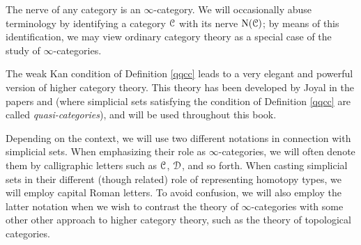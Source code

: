 \begin{1.1.2 inf-Categories}
\begin{example}
The nerve of any category is an $\infty$-category. We will occasionally abuse terminology by
identifying a category $\operatorname{\mathcal{C}}$ with its nerve $\operatorname{N}(\operatorname{\mathcal{C}})$; by means of this identification, we may view ordinary category theory as a special case of the study of $\infty$-categories.
\end{example}

The weak Kan condition of Definition \ref{qqcc} leads to a very elegant and powerful version of higher category theory. This theory has been developed by Joyal in the papers \cite{joyalpub} and
\cite{joyalnotpub} (where simplicial sets satisfying the condition of Definition \ref{qqcc} are called
{\it quasi-categories}), and will be used throughout this book.

\begin{notation}
Depending on the context, we will use two different notations in
connection with simplicial sets. When emphasizing their
role as $\infty$-categories, we will often denote
them by
calligraphic letters such as $\operatorname{\mathcal{C}}$, $\operatorname{\mathcal{D}}$, and so forth. When
casting simplicial sets in their different (though related) role
of representing homotopy types, we will employ capital Roman
letters. To avoid confusion, we will also employ the latter notation
when we wish to contrast the theory of $\infty$-categories with some
other other approach to higher category theory, such as the theory
of topological categories.
\end{notation}
\end{1.1.2 inf-Categories}
